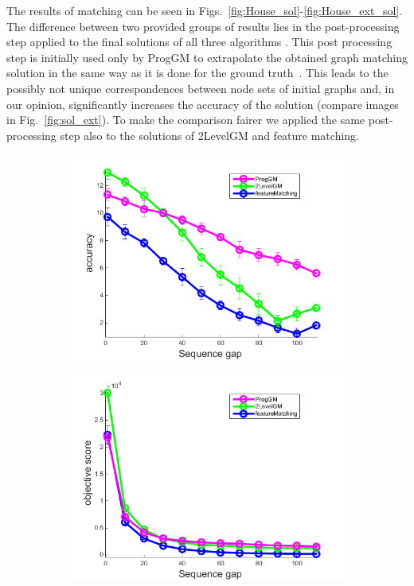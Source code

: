The results of matching can be seen in Figs.~\ref{fig:House_sol}-\ref{fig:House_ext_sol}. The difference between two provided groups of results lies in the post-processing step applied to the final solutions of all three algorithms . This post processing step is initially used only by ProgGM to extrapolate the obtained graph matching solution in the same way as it is done for the ground truth~\cite{Cho2012_ProgressiveGM}. This leads to the possibly not unique correspondences between node sets of initial graphs and, in our opinion, significantly increases the accuracy of the solution (compare images in Fig.~\ref{fig:sol_ext}). To make the comparison fairer we applied the same post-processing step also to the solutions of 2LevelGM and feature matching.

\begin{figure}[h] \centering
		\begin{subfigure}[b]{0.33\textwidth}
			\centering
			\includegraphics[scale=0.25]{"chapter3/fig/HouseSeq2/anchor_descr/using_cpd_afftrafo/solution/performance/accuracy"} 
		\end{subfigure} 
		\begin{subfigure}[b]{0.33\textwidth}
			\centering
			\includegraphics[scale=0.25]{"chapter3/fig/HouseSeq2/anchor_descr/using_cpd_afftrafo/solution/performance/score"} 

\end{subfigure}
\end{figure}

